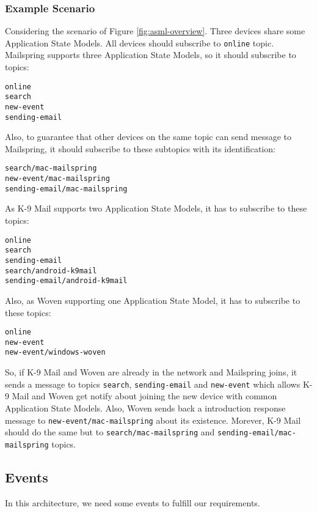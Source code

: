 \subsubsection{Example Scenario}
Considering the scenario of Figure \ref{fig:asml-overview}. Three devices share some Application State Models. All devices should subscribe to \lstinline[basicstyle=\ttfamily]{online} topic. Mailspring supports three Application State Models, so it should subscribe to topics:
\begin{verbatim}
online
search
new-event
sending-email
\end{verbatim}

Also, to guarantee that other devices on the same topic can send message to Mailspring, it should subscribe to these subtopics with its identification: 
\begin{verbatim}
search/mac-mailspring
new-event/mac-mailspring
sending-email/mac-mailspring
\end{verbatim}

As K-9 Mail supports two Application State Models, it has to subscribe to these topics:
\begin{verbatim}
online
search
sending-email
search/android-k9mail
sending-email/android-k9mail
\end{verbatim}


Also, as Woven supporting one Application State Model, it has to subscribe to these topics:
\begin{verbatim}
online
new-event
new-event/windows-woven
\end{verbatim}

So, if K-9 Mail and Woven are already in the network and Mailspring joins, it  sends a message to topics \lstinline[basicstyle=\ttfamily]{search}, \lstinline[basicstyle=\ttfamily]{sending-email} and \lstinline[basicstyle=\ttfamily]{new-event} which allows K-9 Mail and Woven get notify about joining the new device with common Application State Models. Also, Woven sends back a introduction response message to \lstinline[basicstyle=\ttfamily]{new-event/mac-mailspring} about its existence. Morever, K-9 Mail should do the same but to \lstinline[basicstyle=\ttfamily]{search/mac-mailspring} and \lstinline[basicstyle=\ttfamily]{sending-email/mac-mailspring} topics.


\subsection{Events}
In this architecture, we need some events to fulfill our requirements.
